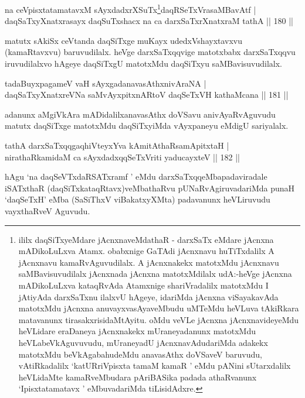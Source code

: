 \begin{shl}
na ceVpisxtatamatavxM sAyxdadxrXSuTx\footnote{ililx daqSiTxyeMdare jAcnxnaveMdathaR - darxSaTx eMdare jAcnxna mADikoLuLxva Atamx. obabxnige GaTAdi jAcnxnavu huTiTxdalilx A jAcnxnavu kamaRvAguvudilalx. A jAcnxnakekx matotxMdu jAcnxnavu saMBavisuvudilalx jAcnxnada jAcnxna matotxMdilalx udA:-heVge jAcnxna mADikoLuLxva kataqRvAda Atamxnige shariVradalilx matotxMdu I jAtiyAda darxSaTxnu ilalxvU hAgeye, idariMda jAcnxna viSayakavAda matotxMdu jAcnxna anuvayxvasAyaveMbudu uMTeMdu heVLuva tAkiRkara matavanunx tirasakxrisidaMtAyitu. oMdu veVLe jAcnxna jAcnxnavideyeMdu heVLidare eraDaneya jAcnxnakekx mUraneyadanunx matotxMdu heVLabeVkAguvuvudu, mUraneyadU jAcnxnavAdudariMda adakekx matotxMdu beVkAgabahudeMdu anavasAthx doVSaveV baruvudu, vAtiRkadalilx `katURriVpisxta tamaM kamaR ' eMdu pANini sUtarxdalilx heVLidaMte kamaRveMbudara pAriBASika padada athaRvanunx `Ipisxtatamatavx ' eMbuvadariMda tiLisidAdxre.}daqRSeTxVrasaMBavAtf |\\
daqSaTxyXnatxrasayx daqSuTxshacx na ca darxSaTxrXnatxraM tathA \hfill || 180 ||
\end{shl}

\begin{artha}
matutx sAkiSx ceVtanda daqSiTxge muKayx udedxVshayxtavxvu (kamaRtavxvu) baruvudilalx. heVge darxSaTxqqvige matotxbabx darxSaTxqqvu iruvudilalxvo hAgeye daqSiTxgU matotxMdu daqSiTxyu saMBavisuvudilalx.
\end{artha}

\begin{shl}
tadaBuyxpagameV vaH sAyxgadanavasAthx\s nivAraNA |\\
daqSaTxyXnatxreVNa saMvAyxpitxnARtoV daqSeTxVH kathaMcana \hfill || 181 ||
\end{shl}

\begin{artha}
adanunx aMgiVkAra mADidalilx\footnotemark[2] anavasAthx doVSavu anivAyaRvAguvudu matutx daqSiTxge matotxMdu daqSiTxyiMda vAyxpaneyu eMdigU sariyalalx.
\end{artha}

\begin{shl}
tathA darxSaTxqqgaqhiVteyxYva kAmitAthaRsamApitxtaH |\\
nirathaRkamidaM ca sAyxdadxqqSeTxVriti yaducayxteV \hfill || 182 ||
\end{shl}

\begin{artha}%
hAgu `na daqSeVTxdaRSATxramf ' eMdu darxSaTxqqeMbapadaviradale iSATxthaR (daqSiTxkataqRtavx)veMbathaRvu pUNaRvAgiruvadariMda punaH `daqSeTxH' eMba (SaSiThxV viBakatxyXMta) padavanunx heVLiruvudu vayxthaRveV Aguvudu.
\end{artha}

